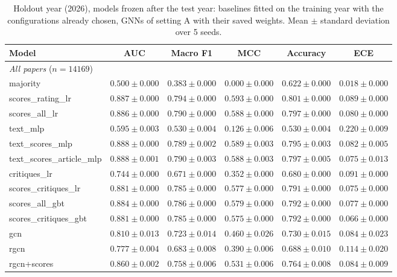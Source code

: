 \begin{table}[t]
\centering
\small
\caption{Holdout year (2026), models frozen after the test year: baselines fitted on the training year with the configurations already chosen, GNNs of setting A with their saved weights. Mean $\pm$ standard deviation over 5 seeds.}
\label{tab:holdout}
\begin{tabular}{lccccc}
\toprule
Model & AUC & Macro F1 & MCC & Accuracy & ECE \\
\midrule
\multicolumn{6}{l}{\emph{All papers} ($n = 14169$)} \\
majority & $0.500 \pm 0.000$ & $0.383 \pm 0.000$ & $0.000 \pm 0.000$ & $0.622 \pm 0.000$ & $0.018 \pm 0.000$ \\
scores\_rating\_lr & $0.887 \pm 0.000$ & $0.794 \pm 0.000$ & $0.593 \pm 0.000$ & $0.801 \pm 0.000$ & $0.089 \pm 0.000$ \\
scores\_all\_lr & $0.886 \pm 0.000$ & $0.790 \pm 0.000$ & $0.588 \pm 0.000$ & $0.797 \pm 0.000$ & $0.080 \pm 0.000$ \\
text\_mlp & $0.595 \pm 0.003$ & $0.530 \pm 0.004$ & $0.126 \pm 0.006$ & $0.530 \pm 0.004$ & $0.220 \pm 0.009$ \\
text\_scores\_mlp & $0.888 \pm 0.000$ & $0.789 \pm 0.002$ & $0.589 \pm 0.003$ & $0.795 \pm 0.003$ & $0.082 \pm 0.005$ \\
text\_scores\_article\_mlp & $0.888 \pm 0.001$ & $0.790 \pm 0.003$ & $0.588 \pm 0.003$ & $0.797 \pm 0.005$ & $0.075 \pm 0.013$ \\
critiques\_lr & $0.744 \pm 0.000$ & $0.671 \pm 0.000$ & $0.352 \pm 0.000$ & $0.680 \pm 0.000$ & $0.091 \pm 0.000$ \\
scores\_critiques\_lr & $0.881 \pm 0.000$ & $0.785 \pm 0.000$ & $0.577 \pm 0.000$ & $0.791 \pm 0.000$ & $0.075 \pm 0.000$ \\
scores\_all\_gbt & $0.884 \pm 0.000$ & $0.786 \pm 0.000$ & $0.579 \pm 0.000$ & $0.792 \pm 0.000$ & $0.077 \pm 0.000$ \\
scores\_critiques\_gbt & $0.881 \pm 0.000$ & $0.785 \pm 0.000$ & $0.575 \pm 0.000$ & $0.792 \pm 0.000$ & $0.066 \pm 0.000$ \\
gcn & $0.810 \pm 0.013$ & $0.723 \pm 0.014$ & $0.460 \pm 0.026$ & $0.730 \pm 0.015$ & $0.084 \pm 0.023$ \\
rgcn & $0.777 \pm 0.004$ & $0.683 \pm 0.008$ & $0.390 \pm 0.006$ & $0.688 \pm 0.010$ & $0.114 \pm 0.020$ \\
rgcn+scores & $0.860 \pm 0.002$ & $0.758 \pm 0.006$ & $0.531 \pm 0.006$ & $0.764 \pm 0.008$ & $0.084 \pm 0.009$ \\

\end{tabular}
\end{table}
